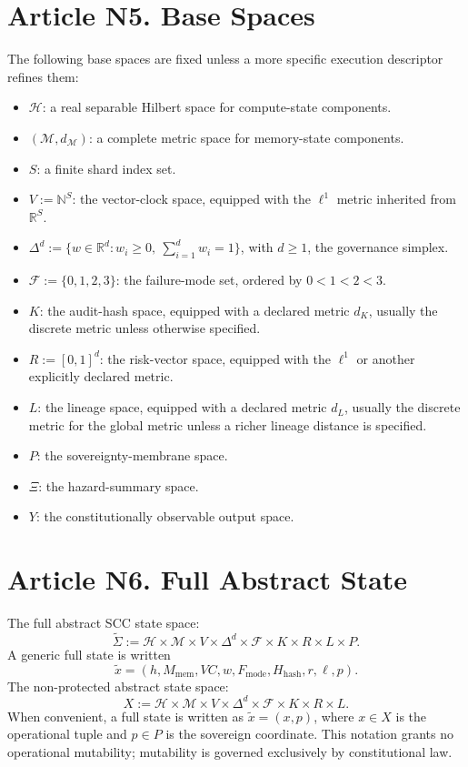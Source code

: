 \documentclass[10pt,oneside]{article}
\theoremstyle{definition}
\theoremstyle{remark}
\newcommand{\N}{\mathbb{N}}
\newcommand{\R}{\mathbb{R}}
\newcommand{\mem}{\mathrm{mem}}
\newcommand{\hash}{\mathrm{hash}}
\newcommand{\mode}{\mathrm{mode}}
\begin{document}
\section{Article N5. Base Spaces}
The following base spaces are fixed unless a more specific execution descriptor refines them:
\begin{itemize}
  \item \(\mathcal{H}\): a real separable Hilbert space for compute-state components.
  \item \((\mathcal{M},d_{\mathcal{M}})\): a complete metric space for memory-state components.
  \item \(S\): a finite shard index set.
  \item \(V:=\N^S\): the vector-clock space, equipped with the \(\ell^1\) metric inherited from \(\R^S\).
  \item \(\Delta^d:=\{w\in\R^d:w_i\geq 0,\ \sum_{i=1}^d w_i=1\}\), with \(d\geq 1\), the governance simplex.
  \item \(\mathcal{F}:=\{0,1,2,3\}\): the failure-mode set, ordered by \(0<1<2<3\).
  \item \(K\): the audit-hash space, equipped with a declared metric \(d_K\), usually the discrete metric unless otherwise specified.
  \item \(R:=[0,1]^d\): the risk-vector space, equipped with the \(\ell^1\) or another explicitly declared metric.
  \item \(L\): the lineage space, equipped with a declared metric \(d_L\), usually the discrete metric for the global metric unless a richer lineage distance is specified.
  \item \(P\): the sovereignty-membrane space.
  \item \(\Xi\): the hazard-summary space.
  \item \(Y\): the constitutionally observable output space.
\end{itemize}

\section{Article N6. Full Abstract State}
The full abstract SCC state space:
\[
\widetilde{\Sigma}:=\mathcal{H}\times\mathcal{M}\times V\times\Delta^d\times\mathcal{F}\times K\times R\times L\times P.
\]
A generic full state is written
\[
\widetilde{x}=(h,M_{\mem},VC,w,F_{\mode},H_{\hash},r,\ell,p).
\]
The non-protected abstract state space:
\[
X:=\mathcal{H}\times\mathcal{M}\times V\times\Delta^d\times\mathcal{F}\times K\times R\times L.
\]
When convenient, a full state is written as \(\widetilde{x}=(x,p)\), where \(x\in X\) is the operational tuple and \(p\in P\) is the sovereign coordinate. This notation grants no operational mutability; mutability is governed exclusively by constitutional law.
\end{document}
